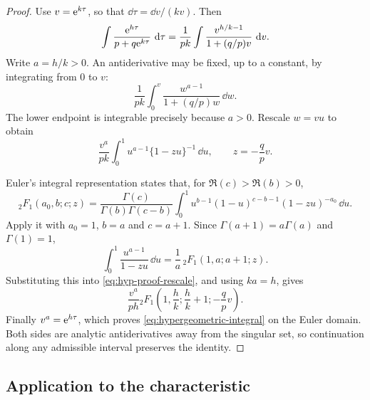 \begin{proof}
Use \(v=\mathrm{e}^{k\tau}\), so that
\(\dd\tau=\dd v/(kv)\).  Then
\begin{equation}
  \int\frac{\mathrm{e}^{h\tau}}{p+q\mathrm{e}^{k\tau}}\,\,\mathrm{d}\tau
  =\frac1{pk}
   \int\frac{v^{h/k-1}}{1+(q/p)v}\,\,\mathrm{d} v.
  \label{eq:hyp-proof-substitution}
\end{equation}
Write \(a=h/k>0\).  An antiderivative may be fixed, up to a constant, by
integrating from \(0\) to \(v\):
\begin{equation}
  \frac1{pk}\int_0^v
  \frac{w^{a-1}}{1+(q/p)w}\,\dd w.
  \label{eq:hyp-proof-definite}
\end{equation}
The lower endpoint is integrable precisely because \(a>0\).  Rescale
\(w=vu\) to obtain
\begin{equation}
  \frac{v^a}{pk}
  \int_0^1
  u^{a-1}
  \{1-zu\}^{-1}\,\dd u,
  \qquad
  z=-\frac qp v.
  \label{eq:hyp-proof-rescale}
\end{equation}

Euler's integral representation states that, for
\(\Re(c)>\Re(b)>0\),
\begin{equation}
  {}_2F_1(a_0,b;c;z)
  =
  \frac{\Gamma(c)}
       {\Gamma(b)\Gamma(c-b)}
  \int_0^1
  u^{b-1}(1-u)^{c-b-1}(1-zu)^{-a_0}\,\dd u.
  \label{eq:euler-hypergeometric}
\end{equation}
Apply it with \(a_0=1\), \(b=a\) and \(c=a+1\).  Since
\(\Gamma(a+1)=a\Gamma(a)\) and \(\Gamma(1)=1\),
\begin{equation}
  \int_0^1\frac{u^{a-1}}{1-zu}\,\dd u
  =\frac1a\,{}_2F_1(1,a;a+1;z).
  \label{eq:euler-specialised}
\end{equation}
Substituting this into \cref{eq:hyp-proof-rescale}, and using
\(ka=h\), gives
\begin{equation}
  \frac{v^a}{ph}
  {}_2F_1\!\left(1,\frac hk;\frac hk+1;-\frac qp v\right).
\end{equation}
Finally \(v^a=\mathrm{e}^{h\tau}\), which proves
\cref{eq:hypergeometric-integral} on the Euler domain.  Both sides are analytic
antiderivatives away from the singular set, so continuation along any admissible
interval preserves the identity.
\end{proof}

\subsection*{Application to the characteristic}

